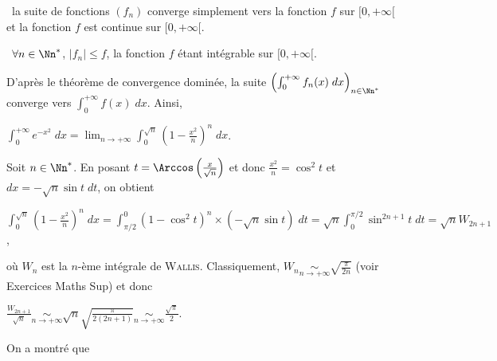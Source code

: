 {\begin{enumerate}
{\textbullet~la suite de fonctions $(f_n)$ converge simplement vers la fonction $f$ sur $[0,+\infty[$ et la fonction $f$ est continue sur $[0,+\infty[$.

\textbullet~$\forall n\in\Nn^*$, $|f_n|\leqslant f$, la fonction $f$ étant intégrable sur $[0,+\infty[$.

D'après le théorème de convergence dominée, la suite $\left(\int_{0}^{+\infty}f_n(x)\;dx\right)_{n\in\Nn^*}$ converge vers $\int_{0}^{+\infty}f(x)\;dx$. Ainsi,

\begin{center}
$\int_{0}^{+\infty}e^{-x^2}\;dx=\lim_{n \rightarrow +\infty}\int_{0}^{\sqrt{n}}\left(1-\frac{x^2}{n}\right)^n\;dx$.
\end{center}

Soit $n\in\Nn^*$. En posant $t=\Arccos\left(\frac{x}{\sqrt{n}}\right)$ et donc $\frac{x^2}{n}=\cos^2t$ et $dx=-\sqrt{n}\sin t\;dt$, on obtient

\begin{center}
$\int_{0}^{\sqrt{n}}\left(1-\frac{x^2}{n}\right)^n\;dx=\int_{\pi/2}^{0}(1-\cos^2t)^n\times(-\sqrt{n}\sin t)\;dt=\sqrt{n}\int_{0}^{\pi/2}\sin^{2n+1}t\;dt=\sqrt{n}W_{2n+1}$,
\end{center}

où $W_n$ est la $n$-ème intégrale de \textsc{Wallis}. Classiquement, $W_n\underset{n\rightarrow+\infty}{\sim}\sqrt{\frac{\pi}{2n}}$ (voir Exercices Maths Sup) et donc

\begin{center}
$\frac{W_{2n+1}}{\sqrt{n}}\underset{n\rightarrow+\infty}{\sim}\sqrt{n}\sqrt{\frac{\pi}{2(2n+1)}}\underset{n\rightarrow+\infty}{\sim}\frac{\sqrt{\pi}}{2}$.
\end{center}

On a montré que

\begin{center}
\end{center}}
\end{enumerate}
}